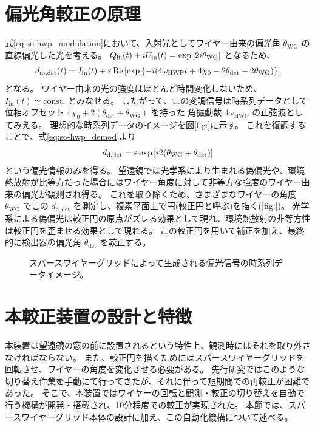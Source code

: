 \documentclass[../../main.tex]{subfiles}
\begin{document}
\section{偏光角較正の原理}
式\eqref{eq:so-hwp_modulation}において、入射光としてワイヤー由来の偏光角 $\theta_{\mathrm{WG}}$ の直線偏光した光を考える。
$Q_{\mathrm{in}}(t) + iU_{\mathrm{in}}(t) = \exp\qty[2i\theta_{\mathrm{WG}}]$ となるため、
\begin{equation}
    d_{\mathrm{m}, \mathrm{det}}(t) = I_{\mathrm{in}}(t) + \varepsilon\Re\qty[\exp\qty{-i \qty(4\omega_{\mathrm{HWP}}t + 4\chi_0 - 2\theta_{\mathrm{det}} - 2\theta_{\mathrm{WG}})}]
\end{equation}
となる。
ワイヤー由来の光の強度はほとんど時間変化しないため、$I_{\mathrm{in}}(t) \simeq \mathrm{const.}$ とみなせる。
したがって、この変調信号は時系列データとして位相オフセット $4\chi_0 + 2(\theta_{\mathrm{det}} + \theta_{\mathrm{WG}})$ を持った
角振動数 $4\omega_{\mathrm{HWP}}$ の正弦波としてみえる。
理想的な時系列データのイメージを図\ref{fig:}に示す。
これを復調することで、式\eqref{eq:so-hwp_demod}より
\begin{equation}
    d_{\mathrm{d, det}} = \varepsilon\exp\qty[i2\qty(\theta_{\mathrm{WG}} + \theta_{\mathrm{det}})]
\end{equation}
という偏光情報のみを得る。
望遠鏡では光学系により生まれる偽偏光や、環境熱放射が比等方だった場合にはワイヤー角度に対して非等方な強度のワイヤー由来の偏光が観測され得る。
これを取り除くため、さまざまなワイヤーの角度 $\theta_{\mathrm{WG}}$ でこの $d_{\mathrm{d, det}}$ を測定し、複素平面上で円(較正円と呼ぶ)を描く(\ref{fig:})。
光学系による偽偏光は較正円の原点がズレる効果として現れ、環境熱放射の非等方性は較正円を歪ませる効果として現れる。
この較正円を用いて補正を加え、最終的に検出器の偏光角 $\theta_{\mathrm{det}}$ を較正する。
\begin{figure}
    \centering
    \caption[スパースワイヤーグリッドによって生成される偏光信号の時系列データイメージ]{スパースワイヤーグリッドによって生成される偏光信号の時系列データイメージ。}
\end{figure}
\section{本較正装置の設計と特徴}
本装置は望遠鏡の窓の前に設置されるという特性上、観測時にはそれを取り外さなければならない。
また、較正円を描くためにはスパースワイヤーグリッドを回転させ、ワイヤーの角度を変化させる必要がある。
先行研究ではこのような切り替え作業を手動にて行ってきたが、それに伴って短期間での再較正が困難であった。
そこで、本装置ではワイヤーの回転と観測・較正の切り替えを自動で行う機構が開発・搭載され、10分程度での較正が実現された。
本節では、スパースワイヤーグリッド本体の設計に加え、この自動化機構について述べる。
\end{document}
